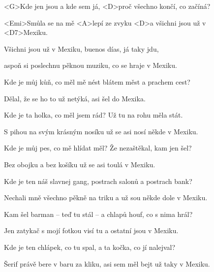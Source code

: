 

\zs
<G>Kde jen jsou a kde sem já, <D>proč všechno končí, co začíná?

<Emi>Smůla se na mě <A>lepí ze zvyku <D>a všichni jsou už 
v <D7>Mexiku.
\ks

\zr
Všichni jsou už v Mexiku, buenos días, já taky jdu,

aspoň si poslechnu pěknou muziku, co se hraje v Mexiku.
\kr

\zs
Kde je můj kůň, co měl mě nést blátem měst a prachem cest?

Dělal, že se ho to už netýká, asi šel do Mexika.
\ks

\zs
Kde je ta holka, co měl jsem rád? Už tu na rohu měla stát.

S pihou na svým krásným nosíku už se asi nosí někde v Mexiku.
\ks

\zr
\kr

\zs
Kde je můj pes, co mě hlídat měl? Že nezaštěkal, kam jen šel?

Bez obojku a bez košíku už se asi toulá v Mexiku.
\ks

\zs
Kde je ten náš slavnej gang, postrach salonů a postrach bank?

Nechali mně všechno pěkně na triku a už sou někde dole v Mexiku.
\ks

\zr
\kr



\zs
Kam šel barman -- teď tu stál -- a chlapů houf, co s nima hrál?

Jen zatykač s mojí fotkou visí tu a ostatní jsou v Mexiku.
\ks

\zs
Kde je ten chlápek, co tu spal, a ta kočka, co jí nalejval?

Šerif právě bere v baru za kliku, asi sem měl bejt už taky v Mexiku.
\ks

\zr\kr \zr\kr


\kp

